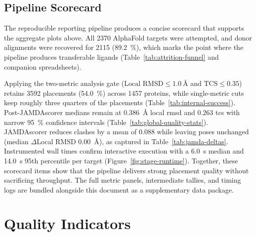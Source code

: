 

\subsection{Pipeline Scorecard}
\label{subsec:pipeline-scorecard}
The reproducible reporting pipeline produces a concise scorecard that supports the aggregate plots above. All \num{2370} AlphaFold targets were attempted, and donor alignments were recovered for \num{2115} (\SI{89.2}{\percent}), which marks the point where the pipeline produces transferable ligands (Table~\ref{tab:attrition-funnel} and companion spreadsheets).

Applying the two-metric analysis gate ($\text{Local RMSD} \leq \SI{1.0}{\angstrom}$ and $\text{TCS} \leq 0.35$) retains \num{3592} placements (\SI{54.0}{\percent}) across \num{1457} proteins, while single-metric cuts keep roughly three quarters of the placements (Table~\ref{tab:internal-success}). Post-JAMDAscorer medians remain at \SI{0.386}{\angstrom} local \gls{rmsd} and 0.263 \gls{tcs} with narrow \SI{95}{\percent} confidence intervals (Table~\ref{tab:global-quality-stats}). JAMDAscorer reduces clashes by a mean of 0.088 while leaving poses unchanged (median $\Delta$Local RMSD \SI{0.00}{\angstrom}), as captured in Table~\ref{tab:jamda-deltas}. Instrumented wall times confirm interactive execution with a \SI{6.0}{\second} median and \SI{14.0}{\second} 95th percentile per target (Figure~\ref{fig:stage-runtime}). Together, these scorecard items show that the pipeline delivers strong placement quality without sacrificing throughput. The full metric panels, intermediate tallies, and timing logs are bundled alongside this document as a supplementary data package.

\section{Quality Indicators}
\label{sec:results-quality}

